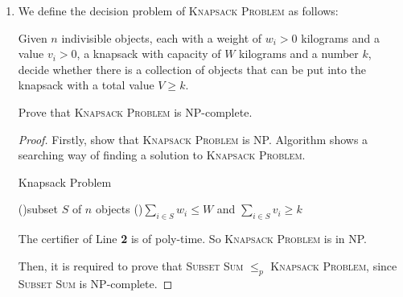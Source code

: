 \documentclass[12pt,a4paper]{article}
\theoremstyle{definition}
\begin{document}
\begin{enumerate}
\begin{proof}
        $\Rightarrow$: if there exists a simple cycle $\Gamma$ in $G=(V,E)$ that contains every node in $V$, then remove the edge in $E^\prime$ will give $\Gamma^\prime$. If $\Gamma$ didn't use any edge in $E^\prime$, then remove any one edge in $\Gamma^\prime$ will give a 2-spanning tree of $G^\prime$. Otherwise $\Gamma^\prime$ is a 2-spanning tree of $G^\prime$.
        
        
        2-ST $\leq_P$ k-ST required.($G^\prime=(V^\prime, E^\prime)$)

    \end{proof}

    \item We define the decision problem of \textsc{Knapsack Problem} as follows:
    
        Given $n$ indivisible objects, each with a weight of $w_i>0$ kilograms and a value $v_i>0$, a knapsack with capacity of $W$ kilograms and a number $k$, decide whether there is a collection of objects that can be put into the knapsack with a total value $V\geq k$.
        
    Prove that \textsc{Knapsack Problem} is NP-complete.

    \begin{proof}
        Firstly, show that \textsc{Knapsack Problem} is NP. Algorithm shows a searching way of finding a solution to \textsc{Knapsack Problem}.

        \begin{algorithm}[h]
            \caption{Knapsack Problem}
            \label{alg:kp}
            \BlankLine
            \ForEach(){subset $S$ of $n$ objects}{
                \lIf(){$\sum_{i\in S}w_i\leq W$ and $\sum_{i\in S}v_i\geq k$}{}
            }
            \;
        \end{algorithm}

        The certifier of Line \textbf{2} is of poly-time. So \textsc{Knapsack Problem} is in NP.

        Then, it is required to prove that \textsc{Subset Sum} $\leq_p$ \textsc{Knapsack Problem}, since \textsc{Subset Sum} is NP-complete.
        

\end{proof}
\end{enumerate}
\end{document}
